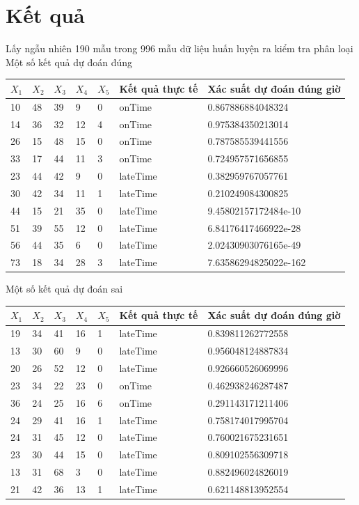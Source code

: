 \documentclass[a4paper, 13pt]{report}
\begin{document}
\section{Kết quả}
Lấy ngẫu nhiên 190 mẫu trong 996 mẫu dữ liệu huấn luyện ra kiểm tra phân loại\\
Một số kết quả dự đoán đúng
\begin{flushleft}
\begin{tabular}{|p{0.6cm}|p{0.6cm}|p{0.6cm}|p{0.6cm}|p{0.6cm}|p{2.5cm}|p{5cm}|}
\hline
$X_1$& $X_2$ & $X_3$ & $X_4$ & $X_5$ & Kết quả thực tế & Xác suất dự đoán đúng giờ \\ 
\hline
10 & 48 & 39 & 9 & 0 & onTime & 0.867886884048324\\
\hline
14 & 36 & 32 & 12 & 4 & onTime & 0.975384350213014\\
\hline
26 & 15 & 48 & 15 & 0 & onTime & 0.787585539441556\\
\hline
33 & 17 & 44 & 11 & 3 & onTime & 0.724957571656855\\
\hline
23 & 44 & 42 & 9 & 0 & lateTime & 0.382959767057761\\
\hline
30 & 42 & 34 & 11 & 1 & lateTime & 0.210249084300825\\
\hline
44 & 15 & 21 & 35 & 0 & lateTime & 9.45802157172484e-10\\
\hline
51 & 39 & 55 & 12 & 0 & lateTime & 6.84176417466922e-28\\
\hline
56 & 44 & 35 & 6 & 0 & lateTime & 2.02430903076165e-49\\
\hline
73 & 18 & 34 & 28 & 3 & lateTime & 7.63586294825022e-162\\
\hline
\end{tabular}
\end{flushleft}
Một số kết quả dự đoán sai
\begin{flushleft}
\begin{tabular}{|p{0.6cm}|p{0.6cm}|p{0.6cm}|p{0.6cm}|p{0.6cm}|p{2.5cm}|p{5cm}|}
\hline
$X_1$& $X_2$ & $X_3$ & $X_4$ & $X_5$ & Kết quả thực tế & Xác suất dự đoán đúng giờ \\ 
\hline
19 & 34 & 41 & 16 & 1 & lateTime & 0.839811262772558\\
\hline
13 & 30 & 60 & 9 & 0 & lateTime & 0.956048124887834\\
\hline
20 & 26 & 52 & 12 & 0 & lateTime & 0.926660526069996\\
\hline
23 & 34 & 22 & 23 & 0 & onTime & 0.462938246287487\\
\hline
36 & 24 & 25 & 16 & 6 & onTime & 0.291143171211406\\
\hline
24 & 29 & 41 & 16 & 1 & lateTime & 0.758174017995704\\
\hline
24 & 31 & 45 & 12 & 0 & lateTime & 0.760021675231651\\
\hline
23 & 30 & 44 & 15 & 0 & lateTime & 0.809102556309718\\
\hline
13 & 31 & 68 & 3 & 0 & lateTime & 0.882496024826019\\
\hline
21 & 42 & 36 & 13 & 1 & lateTime & 0.621148813952554\\
\hline
\end{tabular}
\end{flushleft}
\end{document}
